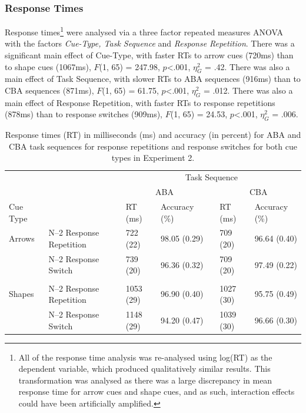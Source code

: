 \documentclass[a4paper, doc, natbib]{apa6}
\begin{document}
\subsubsection{Response Times}
Response times\footnote{All of the response time analysis was re-analysed using log(RT) as the dependent variable, which produced qualitatively similar results. This transformation was analysed as there was a large discrepancy in mean response time for arrow cues and shape cues, and as such, interaction effects could have been artificially amplified.} were analysed via a three factor repeated measures ANOVA with the factors \emph{Cue-Type, Task Sequence} and \emph{Response Repetition}. There was a significant main effect of Cue-Type, with faster RTs to arrow cues (720ms) than to shape cues (1067ms), $F$(1, 65) = 247.98, $p$<.001, $\eta_G^2$ = .42. There was also a main effect of Task Sequence, with slower RTs to ABA sequences (916ms) than to CBA sequences (871ms), $F$(1, 65) = 61.75, $p$<.001, $\eta_G^2$ = .012. There was also a main effect of Response Repetition, with faster RTs to response repetitions (878ms) than to response switches (909ms), $F$(1, 65) = 24.53, $p$<.001, $\eta_G^2$ = .006.


\begin{table}[htbp]
\centering
\caption{Response times (RT) in milliseconds (ms) and accuracy (in percent) for ABA and CBA task sequences for response repetitions and response switches for both cue types in Experiment 2.}
\begin{tabular}{lllllll}
\hline
         &                          & \multicolumn{5}{c}{Task Sequence}                        \\ \cline{3-7}

         &                          & \multicolumn{2}{c}{ABA}   &  & \multicolumn{2}{c}{CBA}   \\\cline{3-4}
\cline{6-7}

Cue Type &                          & RT (ms)   & Accuracy (\%) &  & RT (ms)   & Accuracy (\%) \\ \hline
Arrows   & N--2 Response Repetition & 722 (22)  & 98.05 (0.29)  &  & 709 (20)  & 96.64 (0.40)  \\
         & N--2 Response Switch     & 739 (20)  & 96.36 (0.32)  &  & 709 (20)  & 97.49 (0.22)  \\
         &                          &           &               &  &           &               \\
Shapes   & N--2 Response Repetition & 1053 (29) & 96.90 (0.40)  &  & 1027 (30) & 95.75 (0.49)  \\
         & N--2 Response Switch     & 1148 (29) & 94.20 (0.47)  &  & 1039 (30) & 96.66 (0.30) \\
\hline
\end{tabular}
\label{tab:Experiment2}
\end{table}
\end{document}
